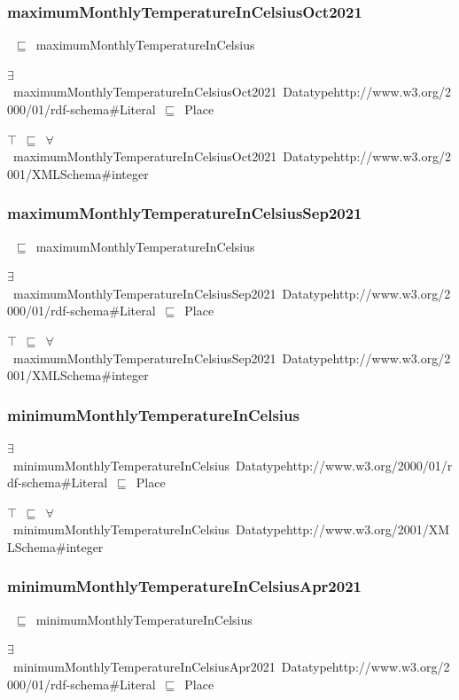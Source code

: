 \documentclass{article}
\begin{document}
\subsubsection*{maximumMonthlyTemperatureInCelsiusOct2021}

~\ensuremath{\sqsubseteq}~maximumMonthlyTemperatureInCelsius

\ensuremath{\exists}~maximumMonthlyTemperatureInCelsiusOct2021~Datatypehttp://www.w3.org/2000/01/rdf-schema#Literal~\ensuremath{\sqsubseteq}~Place

\ensuremath{\top}~\ensuremath{\sqsubseteq}~\ensuremath{\forall}~maximumMonthlyTemperatureInCelsiusOct2021~Datatypehttp://www.w3.org/2001/XMLSchema#integer

\subsubsection*{maximumMonthlyTemperatureInCelsiusSep2021}

~\ensuremath{\sqsubseteq}~maximumMonthlyTemperatureInCelsius

\ensuremath{\exists}~maximumMonthlyTemperatureInCelsiusSep2021~Datatypehttp://www.w3.org/2000/01/rdf-schema#Literal~\ensuremath{\sqsubseteq}~Place

\ensuremath{\top}~\ensuremath{\sqsubseteq}~\ensuremath{\forall}~maximumMonthlyTemperatureInCelsiusSep2021~Datatypehttp://www.w3.org/2001/XMLSchema#integer

\subsubsection*{minimumMonthlyTemperatureInCelsius}

\ensuremath{\exists}~minimumMonthlyTemperatureInCelsius~Datatypehttp://www.w3.org/2000/01/rdf-schema#Literal~\ensuremath{\sqsubseteq}~Place

\ensuremath{\top}~\ensuremath{\sqsubseteq}~\ensuremath{\forall}~minimumMonthlyTemperatureInCelsius~Datatypehttp://www.w3.org/2001/XMLSchema#integer

\subsubsection*{minimumMonthlyTemperatureInCelsiusApr2021}

~\ensuremath{\sqsubseteq}~minimumMonthlyTemperatureInCelsius

\ensuremath{\exists}~minimumMonthlyTemperatureInCelsiusApr2021~Datatypehttp://www.w3.org/2000/01/rdf-schema#Literal~\ensuremath{\sqsubseteq}~Place
\end{document}

